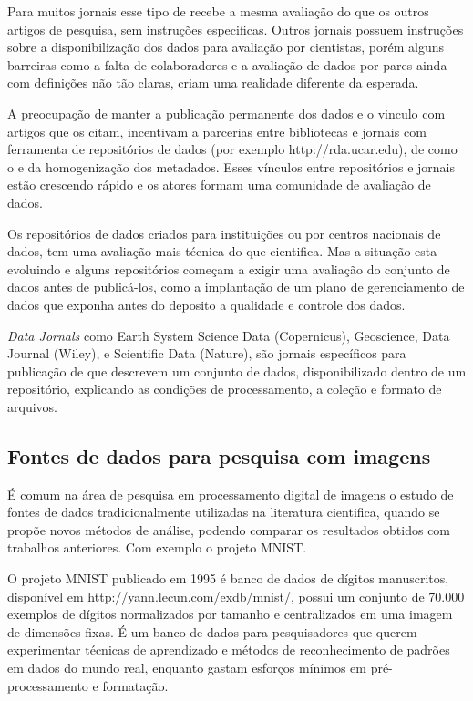Para muitos jornais esse tipo de  recebe a mesma avaliação do que os outros artigos de pesquisa, sem instruções especificas. Outros jornais possuem instruções sobre a disponibilização dos dados para avaliação por cientistas, porém alguns barreiras como a falta de colaboradores e a avaliação de dados por pares ainda com definições não tão claras, criam uma realidade diferente da esperada. 

A preocupação de manter a publicação permanente dos dados e o vinculo com artigos que os citam, incentivam a parcerias entre bibliotecas e jornais com ferramenta de repositórios de dados (por exemplo http://rda.ucar.edu), de  como o  e da homogenização dos metadados. Esses vínculos entre repositórios e jornais estão crescendo rápido e os atores formam uma comunidade de avaliação de dados.

Os repositórios de dados criados para instituições ou por centros nacionais de dados, tem uma avaliação mais técnica do que cientifica. Mas a situação esta evoluindo e alguns repositórios começam a exigir uma avaliação do conjunto de dados antes de publicá-los, como a implantação de um plano de gerenciamento de dados que exponha antes do deposito a qualidade e controle dos dados.

\emph{Data Jornals} como Earth System Science Data (Copernicus), Geoscience, Data Journal (Wiley), e Scientific Data (Nature), são jornais específicos para publicação de  que descrevem um conjunto de dados, disponibilizado dentro de um repositório, explicando as condições de processamento, a coleção e formato de arquivos.


\subsection{Fontes de dados para pesquisa com imagens}

É comum na área de pesquisa em processamento digital de imagens o estudo de fontes de dados tradicionalmente utilizadas na literatura cientifica, quando se propõe novos métodos de análise, podendo comparar os resultados obtidos com trabalhos anteriores. Com exemplo o projeto MNIST.

O projeto MNIST publicado em 1995 é banco de dados de dígitos manuscritos, disponível em http://yann.lecun.com/exdb/mnist/, possui um conjunto de 70.000 exemplos de dígitos normalizados por tamanho e centralizados em uma imagem de dimensões fixas. É um banco de dados para pesquisadores que querem experimentar técnicas de aprendizado e métodos de reconhecimento de padrões em dados do mundo real, enquanto gastam esforços mínimos em pré-processamento e formatação.

